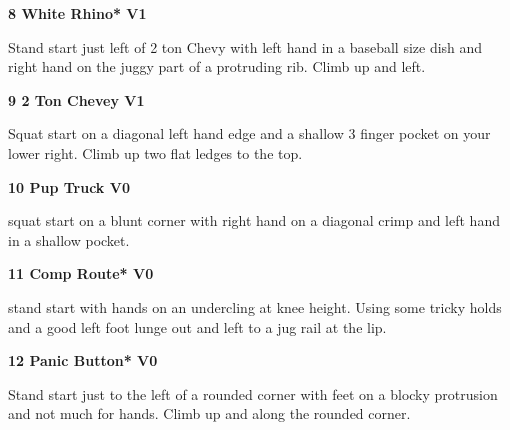 \begin{multicols}{2}
			
			
			\needspace{1.5cm}
\label{rt:White Rhino}
\colorbox{green!20}{
\parbox{0.95\linewidth}{
\textbf{
8 White Rhino* V1  
}}}

			\begin{adjustwidth}{0.5cm}{}			
			Stand start just left of 2 ton Chevy with left hand in a baseball size dish and right hand on the juggy part of a protruding rib. Climb up and left.
			\end{adjustwidth}
			
			
			
			\needspace{1.5cm}
\label{rt:2 Ton Chevey}
\colorbox{green!20}{
\parbox{0.95\linewidth}{
\textbf{
9 2 Ton Chevey V1  
}}}

			\begin{adjustwidth}{0.5cm}{}			
			Squat start on a diagonal left hand edge and a shallow 3 finger pocket on your lower right. Climb up two flat ledges to the top.
			\end{adjustwidth}
			
			
			
			\needspace{1.5cm}
\label{rt:Pup Truck}
\colorbox{green!20}{
\parbox{0.95\linewidth}{
\textbf{
10 Pup Truck V0  
}}}

			\begin{adjustwidth}{0.5cm}{}			
			squat start on a blunt corner with right hand on a diagonal crimp and left hand in a shallow pocket.
			\end{adjustwidth}
			
			


			\needspace{1.5cm}
\label{rt:Comp Route}
\colorbox{green!20}{
\parbox{0.95\linewidth}{
\textbf{
11 Comp Route* V0  
}}}

			\begin{adjustwidth}{0.5cm}{}			
			stand start with hands on an undercling at knee height. Using some tricky holds and a good left foot lunge out and left to a jug rail at the lip.
			\end{adjustwidth}
			
			
			
			\needspace{1.5cm}
\label{rt:Panic Button}
\colorbox{green!20}{
\parbox{0.95\linewidth}{
\textbf{
12 Panic Button* V0  
}}}

			\begin{adjustwidth}{0.5cm}{}			
			Stand start just to the left of a rounded corner with feet on a blocky protrusion and not much for hands. Climb up and along the rounded corner.
			\end{adjustwidth}
			

\end{multicols}
